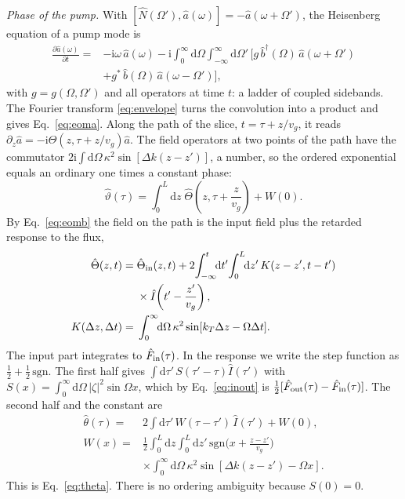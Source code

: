 \documentclass[aps,pra,reprint,superscriptaddress,amsmath,amssymb,floatfix]{revtex4-2}
\newcommand{\Nop}{\hat N}
\newcommand{\Iop}{\hat I}
\newcommand{\dd}{\mathrm{d}}
\newcommand{\ii}{\mathrm{i}}
\begin{document}
\emph{Phase of the pump.} With
$[\Nop(\Omega'),\hat a(\omega)]=-\hat a(\omega+\Omega')$, the Heisenberg
equation of a pump mode is
\begin{align}
\frac{\partial\hat a(\omega)}{\partial t}={}&-\ii\omega\,\hat a(\omega)
-\ii\!\int_0^\infty\!\!\dd\Omega\!\int_{-\infty}^{\infty}\!\!\dd\Omega'\,
\big[g\,\hat b^\dagger(\Omega)\,\hat a(\omega+\Omega')\nonumber\\
&+g^*\,\hat b(\Omega)\,\hat a(\omega-\Omega')\big],
\label{eq:ladder}
\end{align}
with $g=g(\Omega,\Omega')$ and all operators at time $t$: a ladder of coupled
sidebands. The Fourier transform \eqref{eq:envelope} turns the convolution
into a product and gives Eq.~\eqref{eq:eoma}. Along the path of the slice,
$t=\tau+z/v_g$, it reads
$\partial_z\hat a=-\ii\hat\Theta(z,\tau+z/v_g)\hat a$. The field operators at
two points of the path have the commutator
$2\ii\int\!\dd\Omega\,\kappa^2\sin[\Delta k(z-z')]$, a number, so the ordered
exponential equals an ordinary one times a constant phase:
\begin{equation}
\hat\vartheta(\tau)=\int_0^L\!\!\dd z\;\hat\Theta\!\left(z,\tau+\frac{z}{v_g}\right)+W(0).
\label{eq:path}
\end{equation}
By Eq.~\eqref{eq:eomb} the field on the path is the input field plus the
retarded response to the flux,
\begin{align}
\hat\Theta(z,t)={}&\hat\Theta_{\rm in}(z,t)
+2\!\int_{-\infty}^{t}\!\!\dd t'\!\int_0^L\!\!\dd z'\,
K(z-z',t-t')\nonumber\\
&\times\Iop\!\left(t'-\frac{z'}{v_g}\right),
\label{eq:retarded}\\
K(\Delta z,\Delta t)={}&\int_0^\infty\!\!\dd\Omega\,\kappa^2
\sin[k_T\Delta z-\Omega\Delta t].\nonumber
\end{align}
The input part integrates to $\hat F_{\rm in}(\tau)$. In the response we
write the step function as $\tfrac12+\tfrac12\,\mathrm{sgn}$. The first half
gives $\int\!\dd\tau'\,S(\tau'-\tau)\Iop(\tau')$ with
$S(x)=\int_0^\infty\!\dd\Omega\,|\zeta|^2\sin\Omega x$, which by
Eq.~\eqref{eq:inout} is $\tfrac12[\hat F_{\rm out}(\tau)-\hat F_{\rm in}(\tau)]$.
The second half and the constant are
\begin{align}
\hat\theta(\tau)={}&2\!\int\!\dd\tau'\,W(\tau-\tau')\,\Iop(\tau')+W(0),\nonumber\\
W(x)={}&\frac12\!\int_0^L\!\!\dd z\!\int_0^L\!\!\dd z'\,
\mathrm{sgn}\!\Big(x+\frac{z-z'}{v_g}\Big)\nonumber\\
&\times\int_0^\infty\!\!\dd\Omega\,\kappa^2\sin[\Delta k(z-z')-\Omega x].
\label{eq:W}
\end{align}
This is Eq.~\eqref{eq:theta}. There is no ordering ambiguity because
$S(0)=0$.
\end{document}
